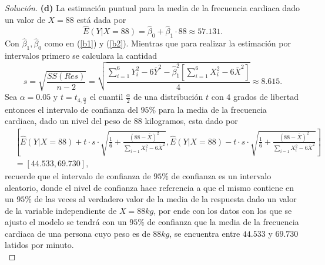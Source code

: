 \documentclass[10.5pt,notitlepage]{article}
\newenvironment{solucion}
  {\begin{proof}[Solución]}
  {\end{proof}}
\newcommand{\corch}[1]{\left[ #1 \right]}
\begin{document}
\begin{solucion}
\noindent\textbf{(d)} La estimación puntual para la media de la frecuencia cardiaca dado un valor de \(X = 88\) está dada por 
\begin{equation}\label{b4}
     \widehat{E}(Y|X = 88) = \hat{\beta}_0 + \hat{\beta}_1 \cdot 88 \approx 57.131.  
\end{equation}
Con \(\hat{\beta}_1,\hat{\beta}_0\) como en (\ref{b1}) y (\ref{b2}). Mientras que para realizar la estimación por intervalos primero se calculara la cantidad 
\begin{equation}\label{b5}
    s = \sqrt{\frac{SS(Res)}{n-2}} =\sqrt{\frac{\sum_{i=1}^{6}Y_{i}^2 - 6\overline{Y}^2 -\hat{\beta}_{1}^{2}\corch{\sum_{i=1}^{6}X_{i}^2 - 6 \overline{X}^2}}{4}} \approx 8.615.
\end{equation}
Sea \(\alpha = 0.05\) y \(t = t_{4,\frac{\alpha}{2}}\) el cuantil \(\frac{\alpha}{2}\) de una distribución \(t\) con \(4\) grados de libertad entonces el intervalo de confianza del \(95\%\) para la media de la frecuencia cardiaca, dado un nivel del peso de \(88\) kilogramos, esta dado por 
\begin{align}\label{b6}
    &\corch{\widehat{E}(Y|X = 88) + t\cdot s\cdot\sqrt{\frac{1}{6} + \frac{(88 - \overline{X})^2}{\sum_{i=1}X_{i}^{2} - 6\overline{X}^2}}  , \widehat{E}(Y|X = 88) -t\cdot s\cdot\sqrt{\frac{1}{6} + \frac{(88 - \overline{X})^2}{\sum_{i=1}X_{i}^{2} - 6\overline{X}^2}} }\nonumber\\ 
    &= [44.533, 69.730],
\end{align}
recuerde que el intervalo de confianza de \(95\%\) de confianza es un intervalo aleatorio, donde el nivel de confianza hace referencia a que el mismo contiene en un \(95\%\) de las veces al verdadero valor de la media de la respuesta dado un valor de la variable independiente de \(X = 88kg\), por ende con los datos con los que se ajusto el modelo se tendrá con un \(95\%\) de confianza que la media de la frecuencia cardiaca de una persona cuyo peso es de \(88kg\), se encuentra entre \(44.533\) y \( 69.730\) latidos por minuto.   
\\ 


\end{solucion}
\end{document}

